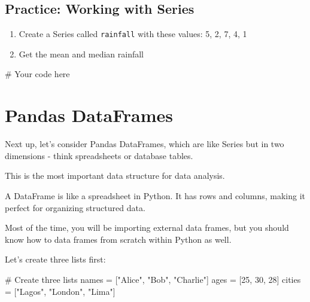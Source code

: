 \documentclass[
  letterpaper,
  DIV=11,
  numbers=noendperiod]{scrreprt}
\newenvironment{Shaded}{\begin{snugshade}}{\end{snugshade}}
\newcommand{\CommentTok}[1]{\textcolor[rgb]{0.37,0.37,0.37}{#1}}
\newcommand{\DecValTok}[1]{\textcolor[rgb]{0.68,0.00,0.00}{#1}}
\newcommand{\NormalTok}[1]{\textcolor[rgb]{0.00,0.23,0.31}{#1}}
\newcommand{\OperatorTok}[1]{\textcolor[rgb]{0.37,0.37,0.37}{#1}}
\newcommand{\StringTok}[1]{\textcolor[rgb]{0.13,0.47,0.30}{#1}}
\providecommand{\tightlist}{%
  \setlength{\itemsep}{0pt}\setlength{\parskip}{0pt}}\usepackage{longtable,booktabs,array}
\begin{document}
\begin{tcolorbox}[enhanced jigsaw, colframe=quarto-callout-tip-color-frame, opacityback=0, titlerule=0mm, bottomrule=.15mm, breakable, leftrule=.75mm, colbacktitle=quarto-callout-tip-color!10!white, title=\textcolor{quarto-callout-tip-color}{\faLightbulb}\hspace{0.5em}{Practice}, rightrule=.15mm, coltitle=black, opacitybacktitle=0.6, colback=white, left=2mm, arc=.35mm, toptitle=1mm, bottomtitle=1mm, toprule=.15mm]

\subsection{Practice: Working with
Series}\label{practice-working-with-series}

\begin{enumerate}
\def\labelenumi{\arabic{enumi}.}
\tightlist
\item
  Create a Series called \texttt{rainfall} with these values: 5, 2, 7,
  4, 1
\item
  Get the mean and median rainfall
\end{enumerate}

\begin{Shaded}
\begin{Highlighting}[]
\CommentTok{\# Your code here}
\end{Highlighting}
\end{Shaded}

\end{tcolorbox}

\section{Pandas DataFrames}\label{pandas-dataframes}

Next up, let's consider Pandas DataFrames, which are like Series but in
two dimensions - think spreadsheets or database tables.

This is the most important data structure for data analysis.

A DataFrame is like a spreadsheet in Python. It has rows and columns,
making it perfect for organizing structured data.

Most of the time, you will be importing external data frames, but you
should know how to data frames from scratch within Python as well.

Let's create three lists first:

\begin{Shaded}
\begin{Highlighting}[]
\CommentTok{\# Create three lists}
\NormalTok{names }\OperatorTok{=}\NormalTok{ [}\StringTok{"Alice"}\NormalTok{, }\StringTok{"Bob"}\NormalTok{, }\StringTok{"Charlie"}\NormalTok{]}
\NormalTok{ages }\OperatorTok{=}\NormalTok{ [}\DecValTok{25}\NormalTok{, }\DecValTok{30}\NormalTok{, }\DecValTok{28}\NormalTok{]}
\NormalTok{cities }\OperatorTok{=}\NormalTok{ [}\StringTok{"Lagos"}\NormalTok{, }\StringTok{"London"}\NormalTok{, }\StringTok{"Lima"}\NormalTok{]}
\end{Highlighting}
\end{Shaded}
\end{document}
